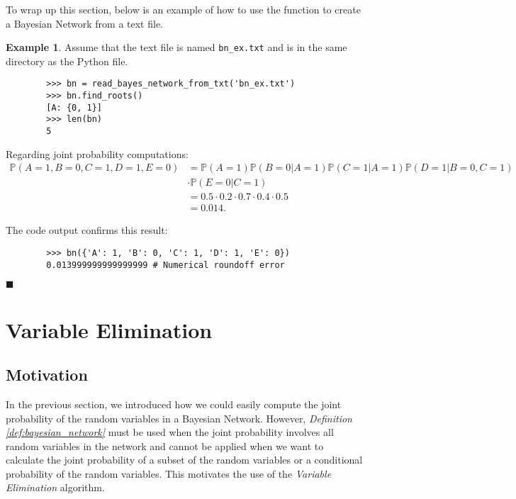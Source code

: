 \documentclass{article}
\theoremstyle{definition}
\newtheorem{example}{Example}
\newenvironment{exampleqed}
    {\begin{example}}
    {\hfill \qedsymbol \end{example}}
\renewcommand{\qedsymbol}{\(\blacksquare\)}
\renewcommand{\P}{\mathbb{P}}
\begin{document}
To wrap up this section, below is an example of how to use the function to create a Bayesian Network from a text file.

\begin{exampleqed}
    Assume that the text file is named \texttt{\texttt{bn\_ex.txt}} and is in the same directory as the Python file.

    \begin{verbatim}
        >>> bn = read_bayes_network_from_txt('bn_ex.txt')
        >>> bn.find_roots()
        [A: {0, 1}]
        >>> len(bn)
        5
    \end{verbatim}

    Regarding joint probability computations:
    \begin{align*}
        \P(A=1, B=0, C=1, D=1, E=0) &= \P(A=1)\P(B=0|A=1)\P(C=1|A=1)\P(D=1|B=0,C=1) \\
        &\cdot \P(E=0|C=1) \\
        &= 0.5 \cdot 0.2 \cdot 0.7 \cdot 0.4 \cdot 0.5 \\
        &= 0.014.
    \end{align*}

    The code output confirms this result:

    \begin{verbatim}
        >>> bn({'A': 1, 'B': 0, 'C': 1, 'D': 1, 'E': 0})
        0.013999999999999999 # Numerical roundoff error
    \end{verbatim}
\end{exampleqed}

\pagebreak

\section{Variable Elimination} \label{sec:variable_elimination}

\subsection{Motivation}

In the previous section, we introduced how we could easily compute the joint probability of the random variables in a Bayesian Network. However, \textit{Definition \ref{def:bayesian_network}} must be used when the joint probability involves all random variables in the network and cannot be applied when we want to calculate the joint probability of a subset of the random variables or a conditional probability of the random variables. This motivates the use of the \textit{Variable Elimination} algorithm.
\end{document}
